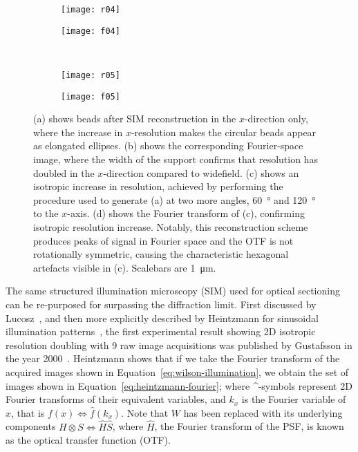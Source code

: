 \begin{figure}[p]
\centering
\begin{subfigure}[b]{0.45\textwidth}
	\texttt{[image: r04]}
	\caption{}\label{fig:beads-x-doubling}
\end{subfigure}
\raisebox{9.3em}{\noindent\Huge$\Leftrightarrow$}
\begin{subfigure}[b]{0.45\textwidth}
	\texttt{[image: f04]}
	\caption{}\label{fig:fourier-x-doubling}
\end{subfigure}
~\newline
\begin{subfigure}[b]{0.45\textwidth}
	\texttt{[image: r05]}
	\caption{}\label{fig:beads-isotropic-doubling}
\end{subfigure}
\raisebox{9.3em}{\noindent\Huge$\Leftrightarrow$}
\begin{subfigure}[b]{0.45\textwidth}
	\texttt{[image: f05]}
	\caption{}\label{fig:fourier-isotropic-doubling}
\end{subfigure}
\caption[LAG SIM: Reconstruction of SIM images takes place in Fourier space]{(a) shows beads after SIM reconstruction in the $x$-direction only, where the increase in $x$-resolution makes the circular beads appear as elongated ellipses.  (b) shows the corresponding Fourier-space image, where the width of the support confirms that resolution has doubled in the $x$-direction compared to widefield. (c) shows an isotropic increase in resolution, achieved by performing the procedure used to generate (a) at two more angles, \SI{60}{\degree} and \SI{120}{\degree} to the $x$-axis. (d) shows the Fourier transform of (c), confirming isotropic resolution increase. Notably, this reconstruction scheme produces peaks of signal in Fourier space and the OTF is not rotationally symmetric, causing the characteristic hexagonal artefacts visible in (c). Scalebars are \SI{1}{\micro\metre}.}
\label{fig:fourier-reconstruction}
\end{figure}

The same structured illumination microscopy (SIM) used for optical sectioning can be re-purposed for surpassing the diffraction limit.
First discussed by Lucosz~\cite{lukosz1966optical}, and then more explicitly described by Heintzmann for sinusoidal illumination patterns~\cite{heintzmann1999laterally}, the first experimental result showing 2D isotropic resolution doubling with 9 raw image acquisitions was published by Gustafsson in the year \num{2000}~\cite{gustafsson2000surpassing}.
Heintzmann shows that if we take the Fourier transform of the acquired images shown in Equation~\ref{eq:wilson-illumination}, we obtain the set of images shown in Equation~\ref{eq:heintzmann-fourier}; where \^{}-symbols represent 2D Fourier transforms of their equivalent variables, and $k_x$ is the Fourier variable of $x$, that is $f(x) \Leftrightarrow \hat{f}(k_x)$.
Note that $W$ has been replaced with its underlying components $H\otimes S \Leftrightarrow \hat{H}\hat{S}$, where $\hat{H}$, the Fourier transform of the PSF, is known as the optical transfer function (OTF).

